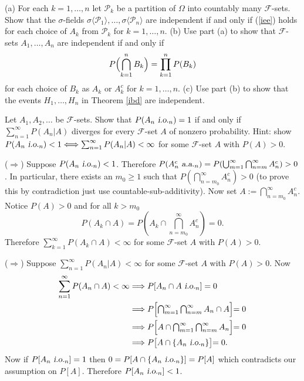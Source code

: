 \begin{exercise}
(a) For each $k=1,\ldots, n$ let $\mathcal P_k$ be a partition of $\Omega$ into countably many $\mathcal F$-sets. Show that the $\sigma$-fields $\sigma\langle\mathcal P_1\rangle,\ldots, \sigma\langle \mathcal P_n\rangle$ are independent if and only if (\ref{iee}) holds for each choice of $A_k$ from $\mathcal P_k$ for $k=1,\ldots, n$. (b) Use part (a) to show that $\mathcal F$-sets $A_1, \ldots, A_n$ are independent if and only if
\[
 P\Bigl( \bigcap_{k=1}^n B_k \Bigr) = \prod_{k=1}^n P(B_k)
\]
for each choice of $B_k$ as $A_k$ or $A_k^c$ for $k=1,\ldots, n$. (c) Use part (b) to show that the events $H_1,\ldots, H_n$ in Theorem \ref{ibd} are independent.
\end{exercise}






\begin{exercise}
Let $A_1, A_2, \ldots$ be $\mathcal F$-sets. Show that $P(A_n{\,\,\text{\sl i.o.} }_n)=1$ if and only if $\sum_{n=1}^\infty P(A_n|A)$ diverges for every $\mathcal F$-set $A$ of nonzero probability. Hint: show $P(A_n{\,\,\text{\sl i.o.} }_n)<1\Longleftrightarrow \sum_{n=1}^\infty P(A_n|A)<\infty$ for some $\mathcal F$-set $A$ with $P(A)>0$.
\end{exercise}
\begin{exerciseproof}
($\Longrightarrow$)
Suppose $P(A_n{\,\,\text{\sl i.o.} }_n)<1$. Therefore  $P(A_n^c {\,\,\text{\sl a.a.} }_n) = P(\bigcup_{m=1}^\infty \bigcap_{n=m}^\infty A_n^c )>0$. In particular, there exists an $m_0\geq 1$ such that $ P(\bigcap_{n=m_0}^\infty A_n^c ) > 0$ (to prove this by contradiction just use countable-sub-additivity).
Now set $A :=  \bigcap_{n=m_0}^\infty A_n^c $. Notice $P(A)>0$ and for all $k> m_0$
\[P(A_k\cap A) = P(A_k \cap \bigcap_{n=m_0}^\infty A_n^c ) = 0.  \]
Therefore $\sum_{k=1}^\infty P(A_k \cap A)<\infty$ for some $\mathcal F$-set $A$ with $P(A)>0$.


($\Longrightarrow$) Suppose  $\sum_{n=1}^\infty P(A_n|A)<\infty$ for some $\mathcal F$-set $A$ with $P(A)>0$.
Now
\begin{align*}
\sum_{n=1}^\infty P(A_n \cap A)<\infty
&\Longrightarrow P[A_n\cap A {\,\,\text{\sl i.o.} }_n] =0\\
&\Longrightarrow P\Bigl[\textstyle\bigcap_{m=1}^\infty \textstyle\bigcap_{n=m}^\infty  A_n\cap A \Bigl] =0\\
&\Longrightarrow P\Bigl[ A\cap \textstyle\bigcap_{m=1}^\infty \textstyle\bigcap_{n=m}^\infty  A_n \Bigl] =0\\
&\Longrightarrow P\bigl[ A\cap \{A_n {\,\,\text{\sl i.o.} }_n \} \bigl] =0.
\end{align*}
Now if $P[A_n {\,\,\text{\sl i.o.} }_n]=1$ then $0=P[A \cap  \{A_n {\,\,\text{\sl i.o.} }_n \}] = P[A]$ which contradicts our assumption on $P[A]$. Therefore $P[A_n {\,\,\text{\sl i.o.} }_n]<1$.
\end{exerciseproof}


